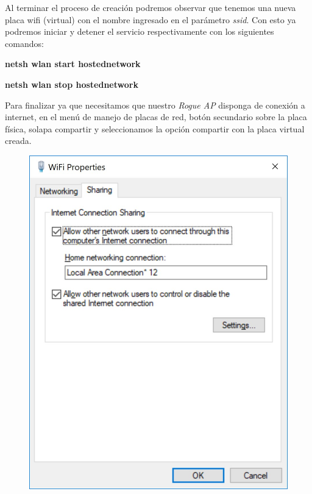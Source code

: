 \documentclass[10pt,a4paper]{article}
\begin{document}
Al terminar el proceso de creación podremos observar que tenemos una nueva placa wifi (virtual) con el nombre ingresado en el parámetro \textit{ssid}. Con esto ya podremos iniciar y detener el servicio respectivamente con los siguientes comandos:

\textbf{netsh wlan start hostednetwork}

\textbf{netsh wlan stop hostednetwork}

Para finalizar ya que necesitamos que nuestro \textit{Rogue AP} disponga de conexión a internet, en el menú de manejo de placas de red, botón secundario sobre la placa física, solapa compartir y seleccionamos la opción compartir con la placa virtual creada.



\begin{figure}[H]
\centerline{\includegraphics[scale=0.2]{images/internet_sharing.jpg}}
\caption{}
\end{figure}
\end{document}
